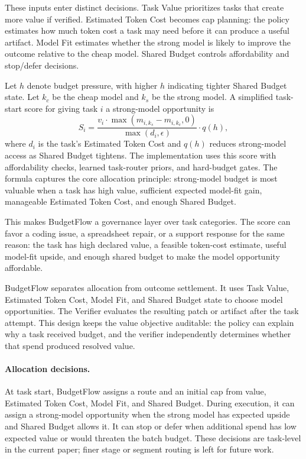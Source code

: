 \documentclass{article}
\newcommand{\method}{BudgetFlow\xspace}
\newcommand{\taskvalue}{Task Value\xspace}
\newcommand{\tokencost}{Estimated Token Cost\xspace}
\newcommand{\modelfit}{Model Fit\xspace}
\newcommand{\sharedbudget}{Shared Budget\xspace}
\newcommand{\verifier}{Verifier\xspace}
\begin{document}
These inputs enter distinct decisions. \taskvalue prioritizes tasks that create more value if verified. \tokencost becomes cap planning: the policy estimates how much token cost a task may need before it can produce a useful artifact. \modelfit estimates whether the strong model is likely to improve the outcome relative to the cheap model. \sharedbudget controls affordability and stop/defer decisions.

Let $h$ denote budget pressure, with higher $h$ indicating tighter \sharedbudget state. Let $k_c$ be the cheap model and $k_s$ be the strong model. A simplified task-start score for giving task $i$ a strong-model opportunity is
\[
    S_i =
    \frac{v_i \cdot \max(m_{i,k_s}-m_{i,k_c},0)}
    {\max(d_i,\epsilon)}
    \cdot q(h),
\]
where $d_i$ is the task's \tokencost and $q(h)$ reduces strong-model access as \sharedbudget tightens. The implementation uses this score with affordability checks, learned task-router priors, and hard-budget gates. The formula captures the core allocation principle: strong-model budget is most valuable when a task has high value, sufficient expected model-fit gain, manageable \tokencost, and enough \sharedbudget.

This makes \method a governance layer over task categories. The score can favor a coding issue, a spreadsheet repair, or a support response for the same reason: the task has high declared value, a feasible token-cost estimate, useful model-fit upside, and enough shared budget to make the model opportunity affordable.

\method separates allocation from outcome settlement. It uses \taskvalue, \tokencost, \modelfit, and \sharedbudget state to choose model opportunities. The \verifier evaluates the resulting patch or artifact after the task attempt. This design keeps the value objective auditable: the policy can explain why a task received budget, and the verifier independently determines whether that spend produced resolved value.

\paragraph{Allocation decisions.}
At task start, \method assigns a route and an initial cap from value, \tokencost, \modelfit, and \sharedbudget. During execution, it can assign a strong-model opportunity when the strong model has expected upside and \sharedbudget allows it. It can stop or defer when additional spend has low expected value or would threaten the batch budget. These decisions are task-level in the current paper; finer stage or segment routing is left for future work.
\end{document}
